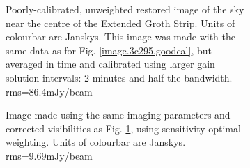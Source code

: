\begin{figure}[t!]
\begin{subfigure}{.43\textwidth}
\caption{\label{image.3c295.nocorr} Poorly-calibrated, unweighted restored image of the sky near the centre of the Extended Groth Strip. {Units of colourbar are Janskys}. This image was made with the same data as for Fig. \ref{image.3c295.goodcal}, but averaged in time and calibrated using larger gain solution intervals: 2 minutes and half the bandwidth. rms=86.4mJy/beam}
\end{subfigure}
\hfill
\begin{subfigure}{.43\textwidth}
\caption{\label{image.3c295.lightcorr} Image made using the same imaging parameters and corrected visibilities as Fig. \ref{image.3c295.nocorr}, using sensitivity-optimal weighting. {Units of colourbar are Janskys}. rms=9.69mJy/beam}
\end{subfigure}
\hfill
\begin{subfigure}{.43\textwidth}

\end{subfigure}
\end{figure}
